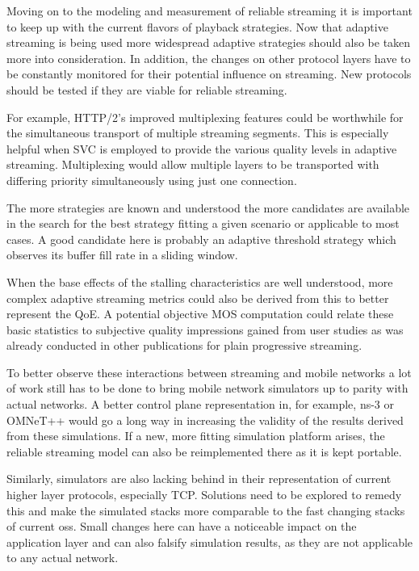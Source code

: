 Moving on to the modeling and measurement of reliable streaming it is important to keep up with the current flavors of playback strategies. Now that adaptive streaming is being used more widespread adaptive strategies should also be taken more into consideration. In addition, the changes on other protocol layers have to be constantly monitored for their potential influence on streaming. New protocols should be tested if they are viable for reliable streaming. 

For example, \gls{HTTP}/2's improved multiplexing features could be worthwhile for the simultaneous transport of multiple streaming segments. This is especially helpful when \gls{SVC} is employed to provide the various quality levels in adaptive streaming. Multiplexing would allow multiple layers to be transported with differing priority simultaneously using just one connection.

The more strategies are known and understood the more candidates are available in the search for the best strategy fitting a given scenario or applicable to most cases. A good candidate here is probably an adaptive threshold strategy which observes its buffer fill rate in a sliding window.

When the base effects of the stalling characteristics are well understood, more complex adaptive streaming metrics could also be derived from this to better represent the \gls{QoE}. A potential objective \gls{MOS} computation could relate these basic statistics to subjective quality impressions gained from user studies as was already conducted in other publications for plain progressive streaming.


To better observe these interactions between streaming and mobile networks a lot of work still has to be done to bring mobile network simulators up to parity with actual networks. A better control plane representation in, for example, ns-3 or OMNeT++ would go a long way in increasing the validity of the results derived from these simulations. If a new, more fitting simulation platform arises, the reliable streaming model can also be reimplemented there as it is kept portable.

Similarly, simulators are also lacking behind in their representation of current higher layer protocols, especially \gls{TCP}. Solutions need to be explored to remedy this and make the simulated stacks more comparable to the fast changing stacks of current \glspl{os}. Small changes here can have a noticeable impact on the application layer and can also falsify simulation results, as they are not applicable to any actual network.

